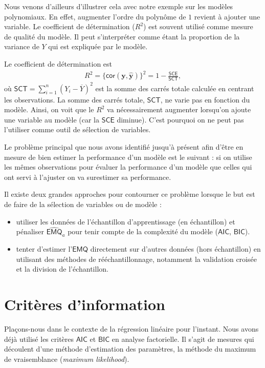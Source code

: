 \documentclass[
  11pt,
  letterpaper,
]{book}
\providecommand{\tightlist}{%
  \setlength{\itemsep}{0pt}\setlength{\parskip}{0pt}}
\theoremstyle{definition}
\theoremstyle{definition}
\theoremstyle{definition}
\theoremstyle{remark}
\begin{document}
Nous venons d'ailleurs d'illustrer cela avec notre exemple sur les modèles polynomiaux. En effet, augmenter l'ordre du polynôme de \(1\) revient à ajouter une variable. Le coefficient de détermination (\(R^2\)) est souvent utilisé comme mesure de qualité du modèle. Il peut s'interpréter comme étant la proportion de la variance de \(Y\) qui est expliquée par le modèle.

Le coefficient de détermination est
\begin{align*}
R^2=\{\mathsf{cor}(\boldsymbol{y}, \widehat{\boldsymbol{y}})\}^2 = 1-\frac{\mathsf{SCE}}{\mathsf{SCT}},
\end{align*}
où \(\mathsf{SCT}=\sum_{i=1}^n (Y_i-\overline{Y})^2\) est la somme des carrés totale calculée en centrant les observations. La somme des carrés totale, \(\mathsf{SCT}\), ne varie pas en fonction du modèle.
Ainsi, on voit que le \(R^2\) va nécessairement augmenter lorsqu'on ajoute une variable au modèle (car la \(\mathsf{SCE}\) diminue). C'est pourquoi on ne peut pas l'utiliser comme outil de sélection de variables.

Le problème principal que nous avons identifié jusqu'à présent afin d'être en mesure de bien estimer la performance d'un modèle est le suivant : si on utilise les mêmes observations pour évaluer la performance d'un modèle que celles qui ont servi à l'ajuster on va surestimer sa performance.

Il existe deux grandes approches pour contourner ce problème lorsque le but est de faire de la sélection de variables ou de modèle :

\begin{itemize}
\tightlist
\item
  utiliser les données de l'échantillon d'apprentissage (en échantillon) et pénaliser \(\widehat{\mathsf{EMQ}}_a\) pour tenir compte de la complexité du modèle (\(\mathsf{AIC}\), \(\mathsf{BIC}\)).
\item
  tenter d'estimer l'\(\mathsf{EMQ}\) directement sur d'autres données (hors échantillon) en utilisant des méthodes de rééchantillonnage, notamment la validation croisée et la division de l'échantillon.
\end{itemize}

\hypertarget{crituxe8res-dinformation}{%
\section{Critères d'information}\label{crituxe8res-dinformation}}

Plaçons-nous dans le contexte de la régression linéaire pour l'instant.
Nous avons déjà utilisé les critères \(\mathsf{AIC}\) et \(\mathsf{BIC}\) en analyse factorielle. Il s'agit de mesures qui découlent d'une méthode d'estimation des paramètres, la méthode du maximum de vraisemblance (\emph{maximum likelihood}).
\end{document}
